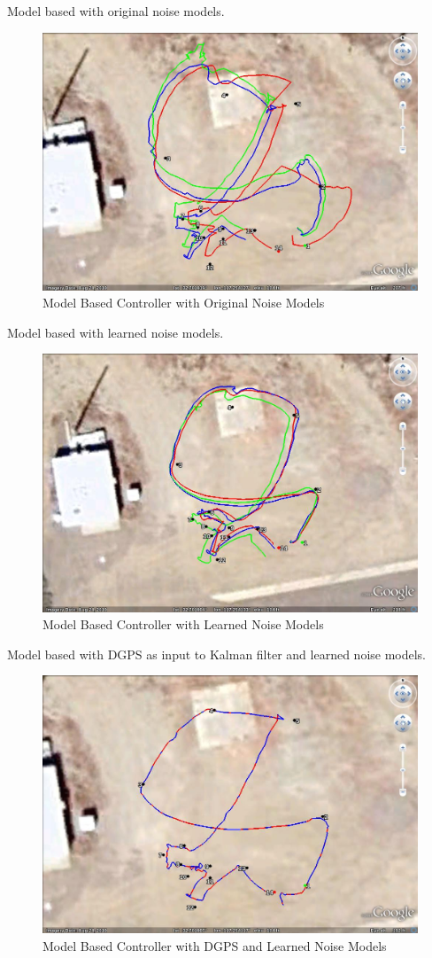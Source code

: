 Model based with original noise models.

\begin{figure}[ht!]
	\centering
	\includegraphics[width=.75\textwidth]{images/GE/20101203_1551_kf_lyapOrigQR}
	\caption{Model Based Controller with Original Noise Models}
	\label{fig:kfResults1}
\end{figure}

Model based with learned noise models.

\begin{figure}[ht!]
	\centering
	\includegraphics[width=.75\textwidth]{images/GE/20101203_1545_kf_lyapNewQR}
	\caption{Model Based Controller with Learned Noise Models}
	\label{fig:kfResults2}
\end{figure}

Model based with DGPS as input to Kalman filter and learned noise models.

\begin{figure}[ht!]
	\centering
	\includegraphics[width=.75\textwidth]{images/GE/20101203_1606_kf_lyapUsingDgpsNewQR}
	\caption{Model Based Controller with DGPS and Learned Noise Models}
	\label{fig:kfResults3}
\end{figure}

